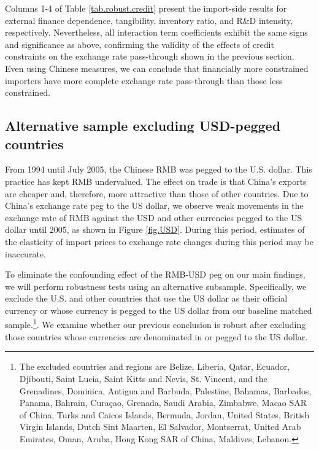 \documentclass[12pt]{article}
\begin{document}
Columns 1-4 of Table \ref{tab.robust.credit} present the import-side results for external finance dependence, tangibility, inventory ratio, and R\&D intensity, respectively. Nevertheless, all interaction term coefficients exhibit the same signs and significance as above, confirming the validity of the effects of credit constraints on the exchange rate pass-through shown in the previous section. Even using Chinese measures, we can conclude that financially more constrained importers have more complete exchange rate pass-through than those less constrained.

\subsection{Alternative sample excluding USD-pegged countries}

From 1994 until July 2005, the Chinese RMB was pegged to the U.S. dollar. This practice has kept RMB undervalued. The effect on trade is that China's exports are cheaper and, therefore, more attractive than those of other countries. Due to China's exchange rate peg to the US dollar, we observe weak movements in the exchange rate of RMB against the USD and other currencies pegged to the US dollar until 2005, as shown in Figure \ref{fig.USD}. During this period, estimates of the elasticity of import prices to exchange rate changes during this period may be inaccurate.

To eliminate the confounding effect of the RMB-USD peg on our main findings, we will perform robustness tests using an alternative subsample. Specifically, we exclude the U.S. and other countries that use the US dollar as their official currency or whose currency is pegged to the US dollar from our baseline matched sample.\footnote{The excluded countries and regions are Belize, Liberia, Qatar, Ecuador, Djibouti, Saint Lucia, Saint Kitts and Nevis, St. Vincent, and the Grenadines, Dominica, Antigua and Barbuda, Palestine, Bahamas, Barbados, Panama, Bahrain, Curaçao, Grenada, Saudi Arabia, Zimbabwe, Macao SAR of China, Turks and Caicos Islands, Bermuda, Jordan, United States, British Virgin Islands, Dutch Sint Maarten, El Salvador, Montserrat, United Arab Emirates, Oman, Aruba, Hong Kong SAR of China, Maldives, Lebanon.}. We examine whether our previous conclusion is robust after excluding those countries whose currencies are denominated in or pegged to the US dollar.
\end{document}
